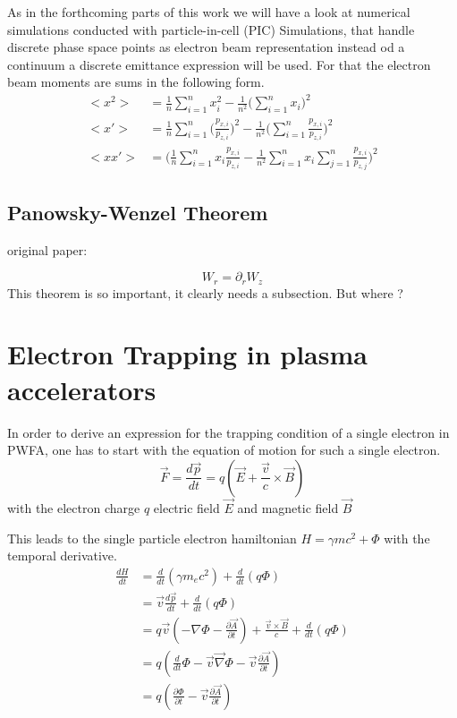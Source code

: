 As in the forthcoming parts of this work we will have a look at numerical simulations conducted with particle-in-cell (PIC) Simulations, that handle discrete phase space points as electron beam representation instead od a continuum a discrete emittance expression will be used. For that the electron beam moments are sums in the following form.
\begin{align}
<x^2>&=\frac{1}{n} \sum_{i=1}^{n} x_i^2-\frac{1}{n^2}\Big(\sum_{i=1}^{n} x_i\Big)^2\\
<x'>&=\frac{1}{n} \sum_{i=1}^{n}\Big(\frac{p_{x,i}}{p_{z,i}}\Big)^2-\frac{1}{n^2}\Big(\sum_{i=1}^{n}\frac{p_{x,i}}{p_{z,i}}\Big)^2\\
<xx'>&=\Big(\frac{1}{n}\sum_{i=1}^{n}x_i\frac{p_{x,i}}{p_{z,i}}-\frac{1}{n^2}\sum_{i=1}^{n}x_i \sum_{j=1}^{n}\frac{p_{x,i}}{p_{z,j}}\Big)^2
\end{align}


\subsection{Panowsky-Wenzel Theorem}

original paper:  \cite{Panowsky_Wenzel_original}

 \begin{equation}
W_r =\partial_r W_z
\end{equation} 
This theorem is so important, it clearly needs a subsection. But where ?


\section{Electron Trapping in plasma accelerators}
\label{sec:Theory_Trapping}


In order to derive an expression for the trapping condition of a single electron in PWFA, one has to start with the equation of motion for such a single electron. 
\begin{equation}
\vec{F}=\frac{d\vec{p}}{dt}=q(\vec{E}+\frac{\vec{v}}{c}\times\vec{B})
\end{equation}
with the electron charge $q$ electric field $\vec{E}$ and magnetic field $\vec{B}$

This leads to the single particle electron hamiltonian $ H=\gamma m c^2+\Phi$ with the temporal derivative.
\begin{align}
\frac{dH}{dt}&=\frac{d}{dt} (\gamma m_e c^2)+\frac{d}{dt}(q\Phi)\\
&=\vec{v}\frac{d\vec{p}}{dt}+\frac{d}{dt}(q\Phi)\\
&=q\vec{v}(-\nabla \Phi-\frac{\partial \vec{A}}{\partial t})+\frac{\vec{v}\times\vec{B}}{c}+\frac{d}{dt}(q\Phi)\\
&=q(\frac{d}{dt}\Phi-\vec{v}\vec{\nabla}\Phi-\vec{v}\frac{\partial \vec{A}}{\partial t})\\
&=q(\frac{\partial \Phi}{\partial t}-\vec{v}\frac{\partial \vec{A}}{\partial t})
\end{align}

